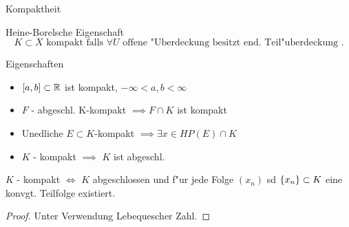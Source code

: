 \documentclass[class=article, crop=false]{standalone}
\begin{document}
\begin{zettel}{Kompaktheit}
\begin{flashcard}
    \begin{definition}[Kompaktheit] Heine-Borelsche Eigenschaft
\[
    K \subset X \text{ kompakt falls } \forall U \text{ offene "Uberdeckung besitzt end. Teil"uberdeckung } 
.\]
\end{definition}
\end{flashcard}

\begin{remark}
    Eigenschaften
\begin{itemize}
    \item $[a,b] \subset \mathbb{R}$ ist kompakt,  $-\infty < a,b < \infty $
    \item $F$ - abgeschl. K-kompakt $\implies F \cap K$ ist kompakt
    \item Unedliche $E \subset K $-kompakt  $\implies \exists x \in  HP (E) \cap K$ 
    \item $K$ - kompakt $\implies $ $K$ ist abgeschl.
\end{itemize}
\end{remark}

\begin{theorem}
$K$ - kompakt $\iff  $  $K$ abgeschlossen und f"ur jede Folge $(x_n )$ sd $\set{x_n } \subset K$ eine konvgt. Teilfolge existiert.
\begin{proof}
    Unter Verwendung Lebequescher Zahl.
\end{proof}
\end{theorem}

\end{zettel}
\end{document}
